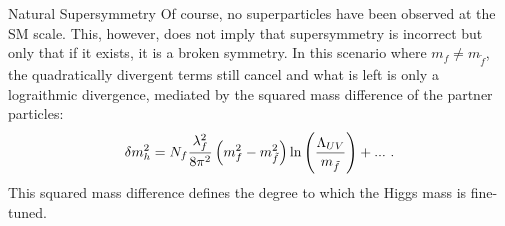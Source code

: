\begin{section}{Natural Supersymmetry}
Of course, no superparticles have been observed at the SM scale.
This, however, does not imply that supersymmetry is incorrect but only that if it exists, it is a broken symmetry.
In this scenario where $m_f \neq m_{\tilde{f}}$, the quadratically divergent terms still cancel and what is left is only a lograithmic divergence, mediated by the squared mass difference of the partner particles:
\begin{align}
\delta m_{h}^2 = N_f\frac{\lambda_f^2}{8\pi^2} \left(m_f^2 - m_{\tilde{f}}^2\right) \ln\left(\frac{\Lambda_{UV}}{m_{\tilde{f}}}\right) + ...\ .
\label{eqn:total_higgs_correction}
\end{align}
This squared mass difference defines the degree to which the Higgs mass is fine-tuned.

\end{section}

